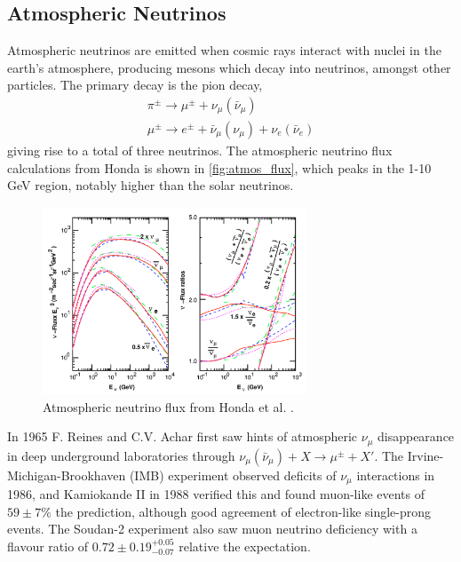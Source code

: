 \subsection{Atmospheric Neutrinos}
Atmospheric neutrinos are emitted when cosmic rays interact with nuclei in the earth's atmosphere, producing mesons which decay into neutrinos, amongst other particles. The primary decay is the pion decay,
\begin{gather*}
	\pi^\pm \rightarrow \mu^\pm + \nu_\mu(\bar{\nu}_\mu) \\
	\mu^\pm \rightarrow e^\pm + \bar{\nu}_\mu (\nu_\mu) + \nu_e (\bar{\nu}_e)
\end{gather*}
giving rise to a total of three neutrinos. The atmospheric neutrino flux calculations from Honda\cite{honda_flux} is shown in \autoref{fig:atmos_flux}, which peaks in the 1-10 GeV region, notably higher than the solar neutrinos.
\begin{figure}[h]
	\includegraphics[width=0.7\textwidth, trim={0mm 0mm 0mm 0mm}, clip,page=1]{figures/theory/honda_flux}
	\caption{Atmospheric neutrino flux from Honda et al. \cite{honda_flux}.}
	\label{fig:atmos_flux}
\end{figure}

In 1965 F. Reines\cite{reines_atmos} and C.V. Achar\cite{india_atmos_hint} first saw hints of atmospheric $\nu_\mu$ disappearance in deep underground laboratories through $\nu_\mu(\bar{\nu}_\mu) + X \rightarrow \mu^\pm + X'$. The Irvine-Michigan-Brookhaven (IMB) experiment observed deficits of $\nu_\mu$ interactions in 1986\cite{imb}, and Kamiokande II in 1988\cite{kamiokande_atmos_hint} verified this and found muon-like events of $59\pm7\%$ the prediction, although good agreement of electron-like single-prong events. The Soudan-2 experiment\cite{soudan2} also saw muon neutrino deficiency with a flavour ratio of $0.72\pm0.19^{+0.05}_{-0.07}$ relative the expectation. 


